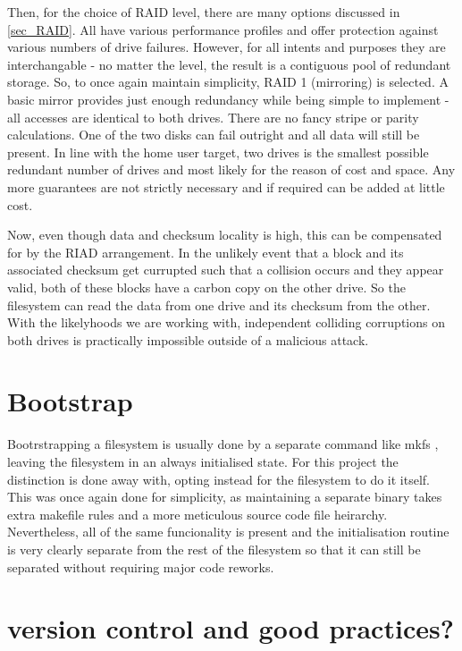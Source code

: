         Then, for the choice of RAID level, there are many options discussed in
        \ref{sec_RAID}. All have various performance profiles and offer
        protection against various numbers of drive failures. However, for all
        intents and purposes they are interchangable - no matter the level, the
        result is a contiguous pool of redundant storage. So, to once again
        maintain simplicity, RAID 1 (mirroring) is selected. A basic mirror
        provides just enough redundancy while being simple to implement - all
        accesses are identical to both drives. There are no fancy stripe or
        parity calculations. One of the two disks can fail outright and all
        data will still be present. In line with the home user target, two
        drives is the smallest possible redundant number of drives and most
        likely for the reason of cost and space. Any more guarantees are not
        strictly necessary and if required can be added at little cost.

        Now, even though data and checksum locality is high, this can be
        compensated for by the RIAD arrangement. In the unlikely event that a
        block and its associated checksum get currupted such that a collision
        occurs and they appear valid, both of these blocks have a carbon copy
        on the other drive. So the filesystem can read the data from one drive
        and its checksum from the other. With the likelyhoods we are working
        with, independent colliding corruptions on both drives is practically
        impossible outside of a malicious attack.

    \section{Bootstrap}

        Bootrstrapping a filesystem is usually done by a separate command like
        mkfs \cite{man_mkfs}, leaving the filesystem in an always initialised
        state. For this project the distinction is done away with, opting
        instead for the filesystem to do it itself. This was once again done
        for simplicity, as maintaining a separate binary takes extra makefile
        rules and a more meticulous source code file heirarchy. Nevertheless,
        all of the same funcionality is present and the initialisation routine
        is very clearly separate from the rest of the filesystem so that it can
        still be separated without requiring major code reworks.

    \section{version control and good practices?}
